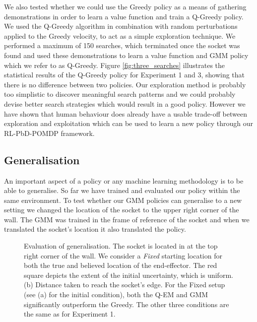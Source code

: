 We also tested whether we could use the Greedy policy as a means of gathering demonstrations in order to learn a value function and 
train a Q-Greedy policy. We used the Q-Greedy algorithm in combination with random perturbations applied to the Greedy velocity, to act as 
a simple exploration technique. We performed a maximum of 150 searches, which terminated once the socket was found and used these demonstrations to 
learn a value function and GMM policy which we refer to as Q-Greedy. Figure \ref{fig:three_searches} illustrates the statistical results 
of the Q-Greedy policy for Experiment 1 and 3, showing that there is no difference between two policies. 
Our exploration method is probably too simplistic to discover meaningful search patterns and we could probably devise better 
search strategies which would result in a good policy. However we have shown that human behaviour does already have a usable trade-off 
between exploration and exploitation which can be used to learn a new policy through our RL-PbD-POMDP framework.

\subsection{Generalisation}

An important aspect of a policy or any machine learning methodology is to be able to generalise. So far we have trained and 
evaluated our policy within the same environment. To test whether our GMM policies can generalise to a new setting we changed 
the location of the socket to the upper right corner of the wall. The GMM was trained in the frame of reference of the socket and
when we translated the socket's location it also translated the policy. 

\begin{figure}
 \centering
    \caption{Evaluation of generalisation. The socket is located in at the top right corner of the wall. We consider a 
    \textit{Fixed} starting location for both the true and believed location of the end-effector. The red square depicts the 
    extent of the initial uncertainty, which is uniform. (b) Distance taken to reach the socket's edge. For the Fixed setup (see (a) for 
    the initial condition), both the Q-EM and GMM significantly outperform the Greedy. The other three conditions are the same as for 
    Experiment 1. }
    \label{fig:experiment5_traj}
\end{figure}

